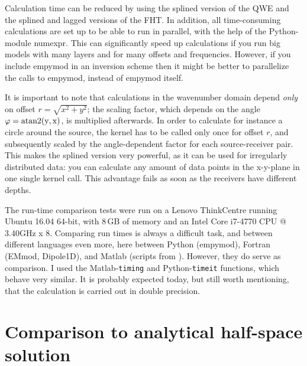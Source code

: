 \documentclass[manuscript,revised]{geophysics}
\begin{document}
Calculation time can be reduced by using the splined version of the QWE and the
splined and lagged versions of the FHT. In addition, all time-consuming
calculations are set up to be able to run in parallel, with the help of the
Python-module numexpr. This can significantly speed up calculations if you run
big models with many layers and for many offsets and frequencies.  However, if
you include empymod in an inversion scheme then it might be better to
parallelize the calls to empymod, instead of empymod itself.

It is important to note that calculations in the wavenumber domain depend
\emph{only} on offset $r = \sqrt{x^2+y^2}$; the scaling factor, which depends
on the angle $\varphi = \rm{atan2}(y, x)$, is multiplied afterwards. In order
to calculate for instance a circle around the source, the kernel has to be
called only once for offset $r$, and subsequently scaled by the angle-dependent
factor for each source-receiver pair. This makes the splined version very
powerful, as it can be used for irregularly distributed data: you can calculate
any amount of data points in the x-y-plane in one single kernel call. This
advantage fails as soon as the receivers have different depths.

The run-time comparison tests were run on a Lenovo ThinkCentre running Ubuntu
16.04 64-bit, with 8\,GB of memory and an Intel Core i7-4770 CPU @ 3.40GHz x 8.
Comparing run times is always a difficult task, and between different languages
even more, here between Python (empymod), Fortran (EMmod, Dipole1D), and Matlab
(scripts from \cite{GEO.12.Key}). However, they do serve as comparison. I used
the Matlab-\texttt{timing} and Python-\texttt{timeit} functions, which behave
very similar. It is probably expected today, but still worth mentioning, that
the calculation is carried out in double precision.

\section{Comparison to analytical half-space solution}
\end{document}
